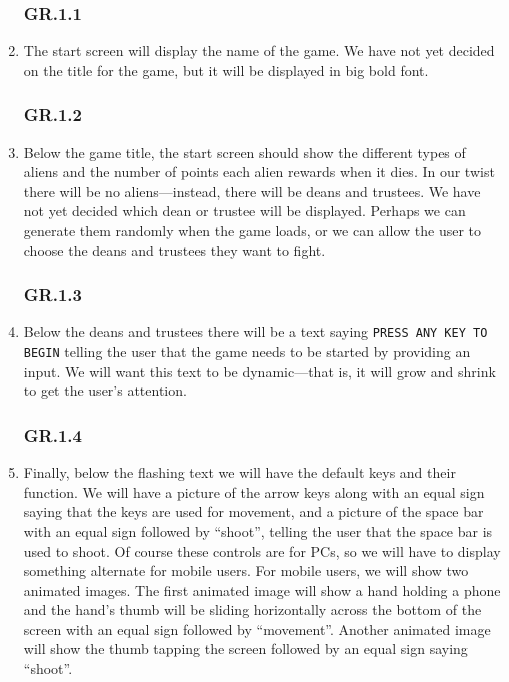 \documentclass[12pt, letterpaper]{article}
\begin{document}
    \begin{enumerate}[label=]
        \subsubsection*{GR.1.1}
        \item The start screen will display the name of the game. We have not yet decided on the title for the game, but it will be displayed in big bold font. 
        \subsubsection*{GR.1.2}
        \label{aliens}
        \item Below the game title, the start screen should show the different types of aliens and the number of points each alien rewards when it dies. In our twist there will be no aliens---instead, there will be deans and trustees. We have not yet decided which dean or trustee will be displayed. Perhaps we can generate them randomly when the game loads, or we can allow the user to choose the deans and trustees they want to fight. 
        \subsubsection*{GR.1.3}
        \label{play_again}
        \item Below the deans and trustees there will be a text saying \verb#PRESS ANY KEY TO BEGIN# telling the user that the game needs to be started by providing an input. We will want this text to be dynamic---that is, it will grow and shrink to get the user's attention. 
        \subsubsection*{GR.1.4}
        \item Finally, below the flashing text we will have the default keys and their function. We will have a picture of the arrow keys along with an equal sign saying that the keys are used for movement, and a picture of the space bar with an equal sign followed by ``shoot'', telling the user that the space bar is used to shoot. Of course these controls are for PCs, so we will have to display something alternate for mobile users. For mobile users, we will show two animated images. The first animated image will show a hand holding a phone and the hand's thumb will be sliding horizontally across the bottom of the screen with an equal sign followed by ``movement''. Another animated image will show the thumb tapping the screen followed by an equal sign saying ``shoot''.
    \end{enumerate}
    
\end{document}
